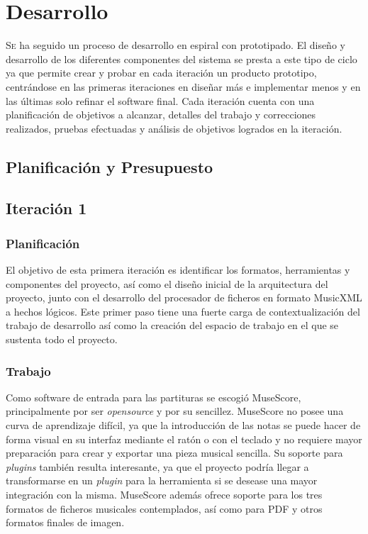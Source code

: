\chapter{Desarrollo}
\label{chap:desarrollo}
\vspace{0.5cm}


\lettrine{S}e ha seguido un proceso de desarrollo en espiral con prototipado. El diseño y desarrollo de los diferentes componentes del sistema se presta a este tipo de ciclo ya que permite crear y probar en cada iteración un producto prototipo, centrándose en las primeras iteraciones en diseñar más e implementar menos y en las últimas solo refinar el software final. Cada iteración cuenta con una planificación de objetivos a alcanzar, detalles del trabajo y correcciones realizados, pruebas efectuadas y análisis de objetivos logrados en la iteración.

\section{Planificación y Presupuesto}

\section{Iteración 1}
\subsection{Planificación}
El objetivo de esta primera iteración es identificar los formatos, herramientas y componentes del proyecto, así como el diseño inicial de la arquitectura del proyecto, junto con el desarrollo del procesador de ficheros en formato MusicXML a hechos lógicos. Este primer paso tiene una fuerte carga de contextualización del trabajo de desarrollo así como la creación del espacio de trabajo en el que se sustenta todo el proyecto.

\subsection{Trabajo}
Como software de entrada para las partituras se escogió MuseScore, principalmente por ser \textit{opensource} y por su sencillez. MuseScore no posee una curva de aprendizaje difícil, ya que la introducción de las notas se puede hacer de forma visual en su interfaz mediante el ratón o con el teclado y no requiere mayor preparación para crear y exportar una pieza musical sencilla. Su soporte para \textit{plugins} también resulta interesante, ya que el proyecto podría llegar a transformarse en un \textit{plugin} para la herramienta si se desease una mayor integración con la misma. MuseScore además ofrece soporte para los tres formatos de ficheros musicales contemplados, así como para PDF y otros formatos finales de imagen.

